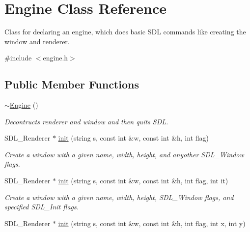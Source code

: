 \hypertarget{classEngine}{}\section{Engine Class Reference}
\label{classEngine}


Class for declaring an engine, which does basic S\+DL commands like creating the window and renderer.  




{\ttfamily \#include $<$engine.\+h$>$}

\subsection*{Public Member Functions}
\begin{DoxyCompactItemize}
\item 
\hyperlink{classEngine_a8ef7030a089ecb30bbfcb9e43094717a}{$\sim$\+Engine} ()\hypertarget{classEngine_a8ef7030a089ecb30bbfcb9e43094717a}{}\label{classEngine_a8ef7030a089ecb30bbfcb9e43094717a}

\begin{DoxyCompactList}\small\item\em Decontructs renderer and window and then quits S\+DL. \end{DoxyCompactList}\item 
S\+D\+L\+\_\+\+Renderer $\ast$ \hyperlink{classEngine_af02c5fcfad817c5c8bc0a3cacfd9d4f8}{init} (string s, const int \&w, const int \&h, int flag)\hypertarget{classEngine_af02c5fcfad817c5c8bc0a3cacfd9d4f8}{}\label{classEngine_af02c5fcfad817c5c8bc0a3cacfd9d4f8}

\begin{DoxyCompactList}\small\item\em Create a window with a given name, width, height, and anyother S\+D\+L\+\_\+\+Window flags. \end{DoxyCompactList}\item 
S\+D\+L\+\_\+\+Renderer $\ast$ \hyperlink{classEngine_aca16d18226665d75acad41b48a8da989}{init} (string s, const int \&w, const int \&h, int flag, int it)\hypertarget{classEngine_aca16d18226665d75acad41b48a8da989}{}\label{classEngine_aca16d18226665d75acad41b48a8da989}

\begin{DoxyCompactList}\small\item\em Create a window with a given name, width, height, S\+D\+L\+\_\+\+Window flags, and specified S\+D\+L\+\_\+\+Init flags. \end{DoxyCompactList}\item 
S\+D\+L\+\_\+\+Renderer $\ast$ \hyperlink{classEngine_a4f80e210f2ae48208eed4ad17c309120}{init} (string s, const int \&w, const int \&h, int flag, int x, int y)\hypertarget{classEngine_a4f80e210f2ae48208eed4ad17c309120}{}\label{classEngine_a4f80e210f2ae48208eed4ad17c309120}


\end{DoxyCompactItemize}
